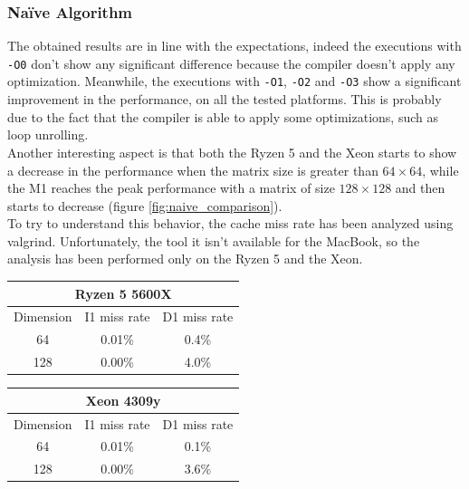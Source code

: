 \documentclass{article}
\begin{document}
\subsubsection{Na\"{i}ve Algorithm}
The obtained results are in line with the expectations, indeed the executions with \texttt{-O0} don't show any significant difference because the compiler 
doesn't apply any optimization. Meanwhile, the executions with \texttt{-O1}, \texttt{-O2} and \texttt{-O3} show a significant improvement in the performance, on all
the tested platforms. This is probably due to the fact that the compiler is able to apply some optimizations, such as loop unrolling. \\
Another interesting aspect is that both the Ryzen 5 and the Xeon starts to show a decrease in the performance when the matrix size is greater than $64 \times 64$, while
the M1 reaches the peak performance with a matrix of size $128 \times 128$ and then starts to decrease (figure \ref{fig:naive_comparison}). \\
To try to understand this behavior, the cache miss rate has been analyzed using valgrind. Unfortunately, the tool it isn't available
for the MacBook, so the analysis has been performed only on the Ryzen 5 and the Xeon. \\ 
\begin{table}[]
    \centering
    \begin{tabular}{|c|c|c|}
    \hline
    \multicolumn{3}{|c|}{\textbf{Ryzen 5 5600X}} \\
    \hline
    Dimension            & I1 miss rate & D1 miss rate \\ \hline
    64                   & 0.01\%       & 0.4\%        \\ \hline
    128                  & 0.00\%       & 4.0\%        \\ \hline 
    \end{tabular}
    \hspace{2em}
    \begin{tabular}{|c|c|c|}
        \hline
        \multicolumn{3}{|c|}{\textbf{Xeon 4309y}} \\
        \hline
        Dimension            & I1 miss rate & D1 miss rate \\ \hline
        64                   & 0.01\%       & 0.1\%        \\ \hline
        128                  & 0.00\%       & 3.6\%        \\ \hline 
        \end{tabular}
\end{table}
\end{document}
